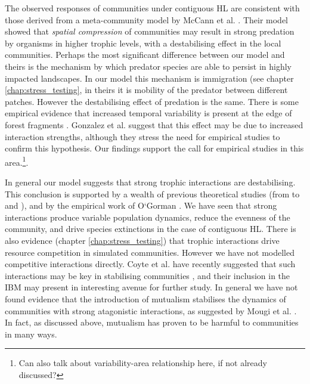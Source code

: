 The observed responses of communities under contiguous HL are consistent with those derived from a meta-community model by McCann et al. \cite{mccann2005dynamics}. Their model showed that \emph{spatial compression} of communities may result in strong predation by organisms in higher trophic levels, with a destabilising effect in the local communities. Perhaps the most significant difference between our model and theirs is the mechanism by which predator species are able to persist in highly impacted landscapes. In our model this mechanism is immigration (see chapter \ref{chap:stress_testing}, in theirs it is mobility of the predator between different patches. However the destabilising effect of predation is the same. There is some empirical evidence that increased temporal variability is present at the edge of forest fragments \cite{ewers2006continuous}. Gonzalez et al. \cite{gonzalez2011disentangled} suggest that this effect may be due to increased interaction strengths, although they stress the need for empirical studies to confirm this hypothesis. Our findings support the call for empirical studies in this area.\footnote{Can also talk about variability-area relationship here, if not already discussed?}.

In general our model suggests that strong trophic interactions are destabilising. This conclusion is supported by a wealth of previous theoretical studies (from \cite{may1972will} to \cite{mccann1998weak} and \cite{neutel2002stability}), and by the empirical work of O`Gorman \cite{o2009perturbations}. We have seen that strong interactions produce variable population dynamics, reduce the evenness of the community, and drive species extinctions in the case of contiguous HL. There is also evidence (chapter \ref{chap:stress_testing}) that trophic interactions drive resource competition in simulated communities. However we have not modelled competitive interactions directly. Coyte et al. have recently suggested that such interactions may be key in stabilising communities \cite{coyte2015ecology}, and their inclusion in the IBM may present in interesting avenue for further study. In general we have not found evidence that the introduction of mutualism stabilises the dynamics of communities with strong atagonistic interactions, as suggested by Mougi et al. \cite{mougi2012diversity}. In fact, as discussed above, mutualism has proven to be harmful to communities in many ways.


